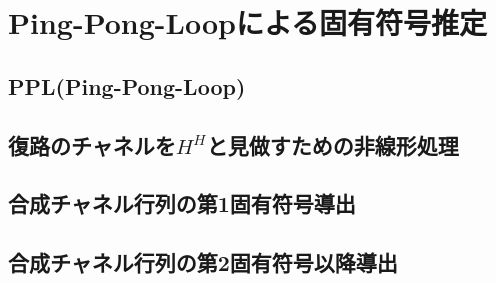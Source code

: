 \chapter{Ping-Pong-Loopによる固有符号推定}

\section{PPL(Ping-Pong-Loop)}

\section{復路のチャネルを$H^H$と見做すための非線形処理}
\section{合成チャネル行列の第1固有符号導出}
\section{合成チャネル行列の第2固有符号以降導出}
